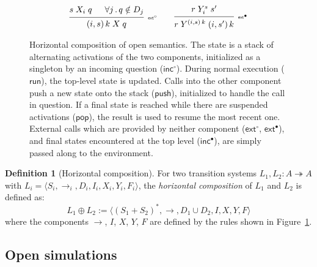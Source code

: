 \documentclass[11pt,oneside,draft]{book}
\theoremstyle{definition}
\newtheorem{definition}[theorem]{Definition}
\newcommand{\kw}[1]{\ensuremath{ \mathsf{#1} }}
\newcommand{\que}{\circ}         %
\newcommand{\ans}{\bullet}       %
\begin{document}
\begin{figure}
\[\begin{array}{c}
      \\
     {\begin{prooftree}
        \hypo{s \mathrel{X_i} q}
        \hypo{\forall j \,.\, q \notin D_j}
        \infer2[\tiny $\kw{ext}^\que$]{(i, s) \, k \mathrel{X} q}
      \end{prooftree}}
      \qquad
     {\begin{prooftree}
        \hypo{r \mathrel{Y_i^s} s'}
        \infer1[\tiny $\kw{ext}^\ans$]{
          r \mathrel{Y^{(i, s) \, k}} (i, s') \, k}
      \end{prooftree}}
    \end{array}
  \]
    \caption[Horizontal composition of open semantics]%
     {Horizontal composition of open semantics.
      The state is a stack of alternating activations
      of the two components,
      initialized as a singleton by an incoming question ($\kw{inc}^\que$).
      During normal execution ($\kw{run}$),
      the top-level state is updated.
      Calls into the other component
      push a new state onto the stack ($\kw{push}$),
      initialized to handle the call in question.
      If a final state is reached
      while there are suspended activations ($\kw{pop}$),
      the result is used to resume the most recent one.
      External calls which are provided by neither component
      ($\kw{ext}^\que$, $\kw{ext}^\ans$),
      and final states encountered at the top level
      ($\kw{inc}^\ans$),
      are simply passed along to the environment.
    }
    \label{fig:hcomp}
\end{figure}

\begin{definition}[Horizontal composition] \label{def:hcomp} %
For two transition systems $L_1, L_2 : A \twoheadrightarrow A$
with
$L_i = \langle S_i, {\rightarrow}_i, D_i, I_i, X_i, Y_i, F_i \rangle$,
the \emph{horizontal composition} of $L_1$ and $L_2$
is defined as:
\[
    L_1 \oplus L_2 :=
    \langle
      (S_1 + S_2)^*, {\rightarrow}, D_1 \cup D_2, I, X, Y, F
    \rangle
\]
where the components $\rightarrow$, $I$, $X$, $Y$, $F$
are defined by
the rules shown in Figure~\ref{fig:hcomp}.
\end{definition}



\subsection{Open simulations} \label{sec:sem:ref} %
\end{document}
